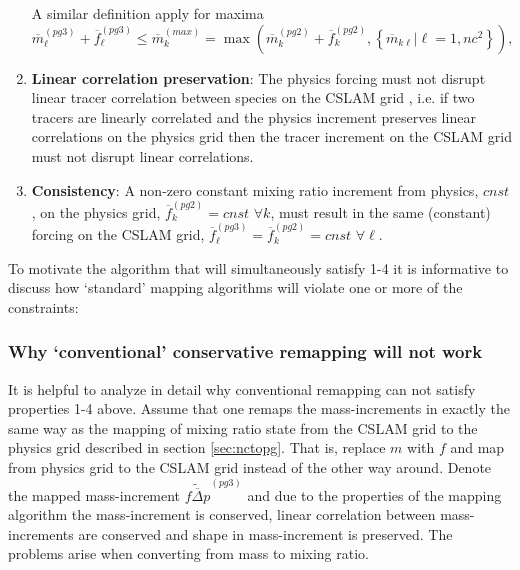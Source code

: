 \documentclass{agujournal}
\begin{document}
\begin{enumerate}
A similar definition apply for maxima
\begin{equation}
\label{eq:max}
{\overline{m}}^{(pg3)}_\ell+{\overline{f}}^{(pg3)}_\ell \le \overline{m}_k^{(max)}=\max \left( {\overline{m}}^{(pg2)}_k+\overline{f}_k^{(pg2)},\left\{ {\overline{m}}_{k\ell} |\ell=1,nc^2\right\} \right),
\end{equation}
\item {\bf{Linear correlation preservation}}: The physics forcing must not disrupt linear tracer correlation between species on the CSLAM grid \citep[see, e.g., ][]{LT2011QJR}, i.e. if two tracers are linearly correlated and the physics increment preserves linear correlations on the physics grid then the tracer increment on the CSLAM grid must not disrupt linear correlations.
\item {\bf{Consistency}}: A non-zero constant mixing ratio increment from physics, $cnst$, on the physics grid, $\overline{f}_k^{(pg2)}=cnst$ $\forall k$, must result in the same (constant) forcing on the CSLAM grid, $\overline{f}_\ell^{(pg3)}=\overline{f}_k^{(pg2)}=cnst$ $\forall \ell$.
\end{enumerate}
To motivate the algorithm that will simultaneously satisfy 1-4 it is informative to discuss how `standard' mapping algorithms will violate one or more of the constraints:
\subsubsection{Why `conventional' conservative remapping will not work}\label{sec:why}
It is helpful to analyze in detail why conventional remapping can not satisfy properties 1-4 above. Assume that one remaps the mass-increments in exactly the same way as the mapping of mixing ratio state from the CSLAM grid to the physics grid described in section \ref{sec:nctopg}. That is, replace $m$ with $f$ and map from physics grid to the CSLAM grid instead of the other way around. Denote the mapped mass-increment $\widetilde{\overline{f\Delta p}}^{(pg3)}$ and due to the properties of the mapping algorithm the mass-increment is conserved, linear correlation between mass-increments are conserved and shape in mass-increment is preserved. The problems arise when converting from mass to mixing ratio.
\end{document}
